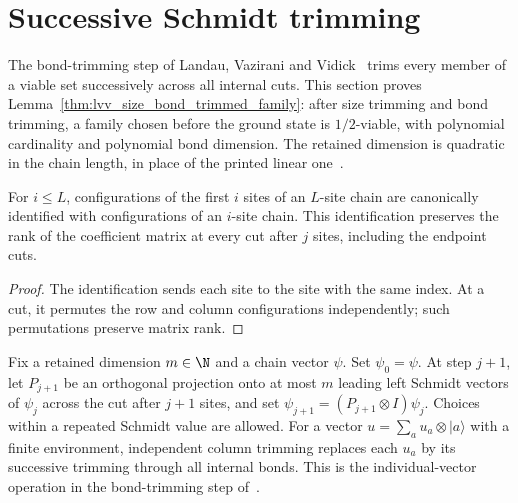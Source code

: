 \section{Successive Schmidt trimming}
\label{sec:lvv_successive_trimming}

The bond-trimming step of Landau, Vazirani and
Vidick~\cite[Claim~2.10, source lines 549--559]{Landau2015Polynomial} trims every
member of a viable set successively across all internal cuts. This section proves
Lemma~\ref{thm:lvv_size_bond_trimmed_family}: after size trimming and bond
trimming, a family chosen before the ground state is $1/2$-viable, with polynomial
cardinality and polynomial bond dimension. The retained dimension is quadratic in the
chain length, in place of the printed linear one~\cite{gap:lvv13_trimming_radius}.

\begin{lemma}
    \label{lem:lvv_left_coordinates}
    \leanok
    For $i\le L$, configurations of the first $i$ sites of an $L$-site chain
    are canonically identified with configurations of an $i$-site chain.
    This identification preserves the rank of the coefficient matrix at
    every cut after $j$ sites, including the endpoint cuts.
\end{lemma}
\begin{proof}
    \leanok
    The identification sends each site to the site with the same index.
    At a cut, it permutes the row and column configurations independently;
    such permutations preserve matrix rank.
\end{proof}

\begin{definition}
    \label{def:lvv_successive_trimming}
    \leanok
    Fix a retained dimension $m\in\N$ and a chain vector $\psi$.
    Set $\psi_0=\psi$. At step $j+1$, let $P_{j+1}$ be an orthogonal
    projection onto at most $m$ leading left Schmidt vectors of $\psi_j$
    across the cut after $j+1$ sites, and set
    $\psi_{j+1}=(P_{j+1}\otimes I)\psi_j$.
    Choices within a repeated Schmidt value are allowed. For a vector
    $u=\sum_a u_a\otimes|a\rangle$ with a finite environment, independent
    column trimming replaces each $u_a$ by its successive trimming through
    all internal bonds. This is the individual-vector operation in the
    bond-trimming step of~\cite[source lines 549--559]{Landau2015Polynomial}.
\end{definition}

